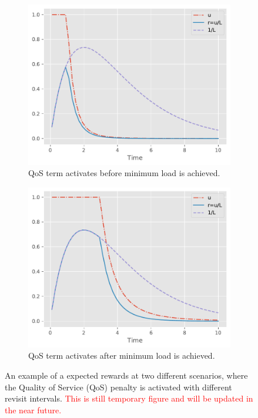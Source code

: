 \documentclass[english, 12pt, a4paper, elec, utf8, a-1b, online]{aaltothesis}
\begin{document}
\begin{figure}[h]
    \centering
    \begin{subfigure}[b]{0.45\textwidth}
        \centering
        \includegraphics[width=\textwidth]{figures/reward.pdf}
        \caption{QoS term activates before minimum load is achieved.}
    \end{subfigure}
    \begin{subfigure}[b]{0.45\textwidth}
        \centering
        \includegraphics[width=\textwidth]{figures/reward2.pdf}
        \caption{QoS term activates after minimum load is achieved.}
    \end{subfigure}
    \caption{An example of a expected rewards at two different scenarios, where the Quality of Service (QoS) penalty is activated with different revisit intervals. \textcolor{red}{This is still temporary figure and will be updated in the near future.}
    }
    \label{fig:my_label}
\end{figure}
\end{document}
